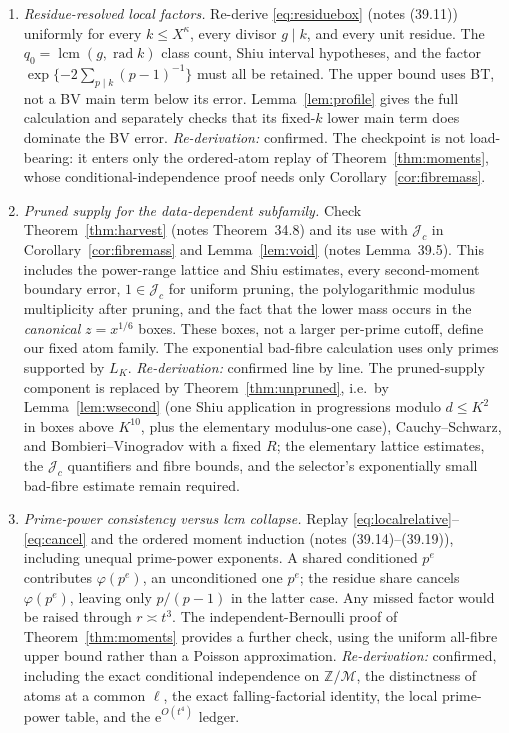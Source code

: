 \documentclass[10pt,reqno]{amsart}
\theoremstyle{remark}
\newcommand{\J}{\mathcal J}
\newcommand{\lcm}{\operatorname{lcm}}
\newcommand{\rad}{\operatorname{rad}}
\newcommand{\e}{\mathrm e}
\begin{document}
\begin{enumerate}
\item \emph{Residue-resolved local factors.}
Re-derive \eqref{eq:residuebox} (notes (39.11)) uniformly for every
$k\leq X^\kappa$, every divisor $g\mid k$, and every unit residue.
The $q_0=\lcm(g,\rad k)$ class count, Shiu interval hypotheses, and the
factor $\exp\{-2\sum_{p\mid k}(p-1)^{-1}\}$ must all be retained.
The upper bound uses BT, not a BV main term below its error.
Lemma~\ref{lem:profile} gives the full calculation and separately checks
that its fixed-$k$ lower main term does dominate the BV error.
\emph{Re-derivation:} confirmed.  The checkpoint is not load-bearing:
it enters only the ordered-atom replay of Theorem~\ref{thm:moments},
whose conditional-independence proof needs only
Corollary~\ref{cor:fibremass}.

\item \emph{Pruned supply for the data-dependent subfamily.}
Check Theorem~\ref{thm:harvest} (notes Theorem~34.8) and its use with
$\J_c$ in Corollary~\ref{cor:fibremass} and Lemma~\ref{lem:void}
(notes Lemma~39.5).  This includes the power-range lattice and Shiu
estimates, every second-moment boundary error, $1\in\J_c$ for uniform
pruning, the polylogarithmic modulus multiplicity after pruning, and the
fact that the lower mass occurs in the \emph{canonical} $z=x^{1/6}$ boxes.
These boxes, not a larger per-prime cutoff, define our fixed atom family.
The exponential bad-fibre calculation uses only primes supported by $L_K$.
\emph{Re-derivation:} confirmed line by line.  The pruned-supply
component is replaced by Theorem~\ref{thm:unpruned}, i.e.\ by
Lemma~\ref{lem:wsecond} (one Shiu application in progressions modulo
$d\leq K^2$ in boxes above $K^{10}$, plus the elementary modulus-one
case), Cauchy--Schwarz, and Bombieri--Vinogradov with a fixed $R$; the
elementary lattice estimates, the $\J_c$ quantifiers and fibre bounds,
and the selector's exponentially small bad-fibre estimate remain
required.

\item \emph{Prime-power consistency versus lcm collapse.}
Replay \eqref{eq:localrelative}--\eqref{eq:cancel} and the ordered moment
induction (notes (39.14)--(39.19)), including unequal prime-power exponents.
A shared conditioned $p^e$ contributes $\varphi(p^e)$, an unconditioned one
$p^e$; the residue share cancels $\varphi(p^e)$, leaving only $p/(p-1)$
in the latter case.  Any missed factor would be raised through
$r\asymp t^3$.  The independent-Bernoulli proof of
Theorem~\ref{thm:moments} provides a further check, using the uniform
all-fibre upper bound rather than a Poisson approximation.
\emph{Re-derivation:} confirmed, including the exact conditional
independence on $\mathbb Z/\mathcal M$, the distinctness of atoms at a
common $\ell$, the exact falling-factorial identity, the local
prime-power table, and the $\e^{O(t^4)}$ ledger.
\end{enumerate}
\end{document}
